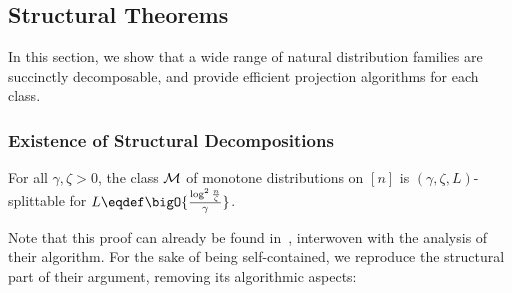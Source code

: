 \subsection{Structural Theorems}\label{sec:structural}
In this section, we show that a wide range of  natural distribution families 
are succinctly decomposable, and provide efficient projection algorithms
for each class. 

\subsubsection{Existence of Structural Decompositions} \label{ssec:struct-existence}

\begin{theorem}[Monotonicity]\label{theo:structural:monotone}
For all $\gamma, \zeta > 0$, the class $\mathcal{M}$ of monotone distributions on $[n]$ is $(\gamma,\zeta,L)$-splittable for $L \eqdef \bigO{\frac{\log^2 \frac{n}{\zeta}}{\gamma}}$.
\end{theorem}
\noindent Note that this proof can already be found in~\cite[Theorem 10]{BKR:04}, interwoven with the analysis of their algorithm. For the sake of being self-contained, we reproduce the structural part of their argument, removing its algorithmic aspects:
